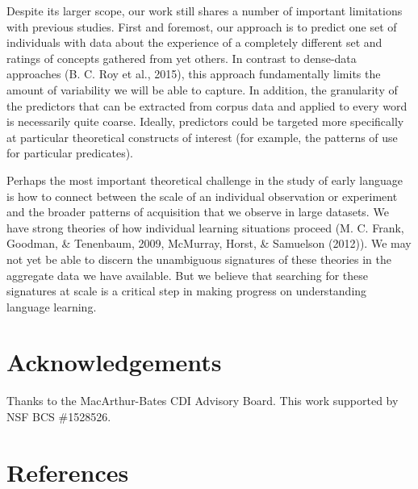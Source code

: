 \documentclass[10pt, letterpaper]{article}
\begin{document}
Despite its larger scope, our work still shares a number of important
limitations with previous studies. First and foremost, our approach is
to predict one set of individuals with data about the experience of a
completely different set and ratings of concepts gathered from yet
others. In contrast to dense-data approaches (B. C. Roy et al., 2015),
this approach fundamentally limits the amount of variability we will be
able to capture. In addition, the granularity of the predictors that can
be extracted from corpus data and applied to every word is necessarily
quite coarse. Ideally, predictors could be targeted more specifically at
particular theoretical constructs of interest (for example, the patterns
of use for particular predicates).

Perhaps the most important theoretical challenge in the study of early
language is how to connect between the scale of an individual
observation or experiment and the broader patterns of acquisition that
we observe in large datasets. We have strong theories of how individual
learning situations proceed (M. C. Frank, Goodman, \& Tenenbaum, 2009,
McMurray, Horst, \& Samuelson (2012)). We may not yet be able to discern
the unambiguous signatures of these theories in the aggregate data we
have available. But we believe that searching for these signatures at
scale is a critical step in making progress on understanding language
learning.

\section{Acknowledgements}\label{acknowledgements}

Thanks to the MacArthur-Bates CDI Advisory Board. This work supported by
NSF BCS \#1528526.

\section{References}\label{references}

\setlength{\parindent}{-0.1in} \setlength{\leftskip}{0.125in} \noindent
\end{document}
